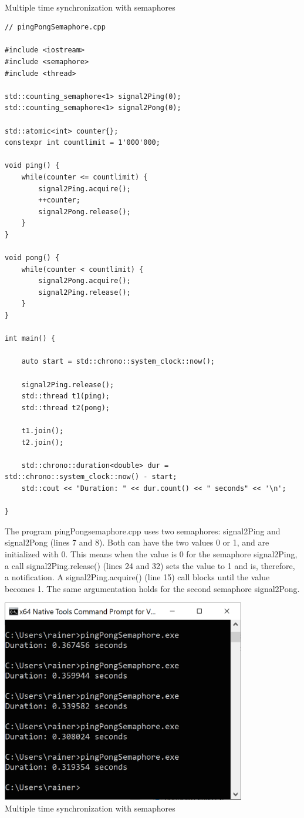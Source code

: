 \hspace*{\fill} \\ %
\noindent
Multiple time synchronization with semaphores
\begin{lstlisting}[style=styleCXX]
// pingPongSemaphore.cpp

#include <iostream>
#include <semaphore>
#include <thread>

std::counting_semaphore<1> signal2Ping(0);
std::counting_semaphore<1> signal2Pong(0);

std::atomic<int> counter{};
constexpr int countlimit = 1'000'000;

void ping() {
	while(counter <= countlimit) {
		signal2Ping.acquire();
		++counter;
		signal2Pong.release();
	}
}

void pong() {
	while(counter < countlimit) {
		signal2Pong.acquire();
		signal2Ping.release();
	}
}

int main() {

	auto start = std::chrono::system_clock::now();
	
	signal2Ping.release();
	std::thread t1(ping);
	std::thread t2(pong);
	
	t1.join();
	t2.join();
	
	std::chrono::duration<double> dur = std::chrono::system_clock::now() - start;
	std::cout << "Duration: " << dur.count() << " seconds" << '\n';

}
\end{lstlisting}

The program pingPongsemaphore.cpp uses two semaphores: signal2Ping and signal2Pong (lines 7 and 8). Both can have the two values 0 or 1, and are initialized with 0. This means when the value is 0 for the semaphore signal2Ping, a call signal2Ping.release() (lines 24 and 32) sets the value to 1 and is, therefore, a notification. A signal2Ping.acquire() (line 15) call blocks until the value becomes 1. The same argumentation holds for the second semaphore signal2Pong.

\begin{center}
\includegraphics[width=0.8\textwidth]{content/3/chapter7/images/6.png}\\
Multiple time synchronization with semaphores
\end{center}

